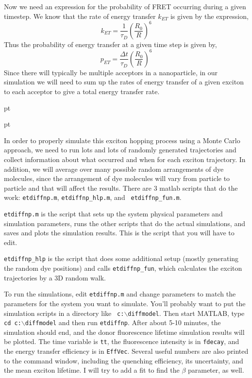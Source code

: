 \documentclass[12pt]{article}
\begin{document}
Now we need an expression for the probability of FRET occurring during
a given timestep.  We know that the rate of energy transfer $k_{ET}$
is given by the expression,
%
$$
k_{ET} = \frac{1}{\tau_D} \left( \frac{R_0}{R} \right)^6
$$
Thus the probability of energy transfer at a given time step is given by,
%
$$
p_{ET} = \frac{\Delta t}{\tau_D} \left( \frac{R_0}{R} \right)^6
$$
%
Since there will typically be multiple acceptors in a nanoparticle, in
our simulation we will need to sum up the rates of energy transfer of
a given exciton to each acceptor to give a total energy transfer rate.

 pt

  pt

In order to properly simulate this exciton hopping process using a
Monte Carlo approach, we need to run lots and lots of randomly
generated trajectories and collect information about what occurred and
when for each exciton trajectory.  In addition, we will average over
many possible random arrangements of dye molecules, since the
arrangement of dye molecules will vary from particle to particle and
that will affect the results.  There are 3 {\sc matlab} scripts that
do the work: {\tt etdiffnp.m}, {\tt etdiffnp\_hlp.m}, and {\tt
  etdiffnp\_fun.m}.

{\tt etdiffnp.m} is the script that sets up the system physical
parameters and simulation parameters, runs the other scripts that do
the actual simulations, and saves and plots the simulation results.
This is the script that you will have to edit.

{\tt etdiffnp\_hlp} is the script that does some additional setup (mostly
generating the random dye positions) and calls {\tt etdiffnp\_fun},
which calculates the exciton trajectories by a 3D random walk.

To run the simulations, edit {\tt etdiffnp.m} and change parameters to
match the parameters for the system you want to simulate.  You'll
probably want to put the simulation scripts in a directory like {\tt
  c:$\backslash$diffmodel}.  Then start {\sc MATLAB}, type {\tt cd
  c:$\backslash$diffmodel} and then run {\tt etdiffnp}.  After about
5-10 minutes, the simulation should end, and the donor fluorescence
lifetime simulation results will be plotted.  The time variable is
{\tt tt}, the fluorescence intensity is in {\tt fdecay}, and the
energy transfer efficiency is in {\tt EffVec}.  Several useful numbers
are also printed to the command window, including the quenching
efficiency, its uncertainty, and the mean exciton lifetime.  I will
try to add a fit to find the $\beta$ parameter, as well.
\end{document}
